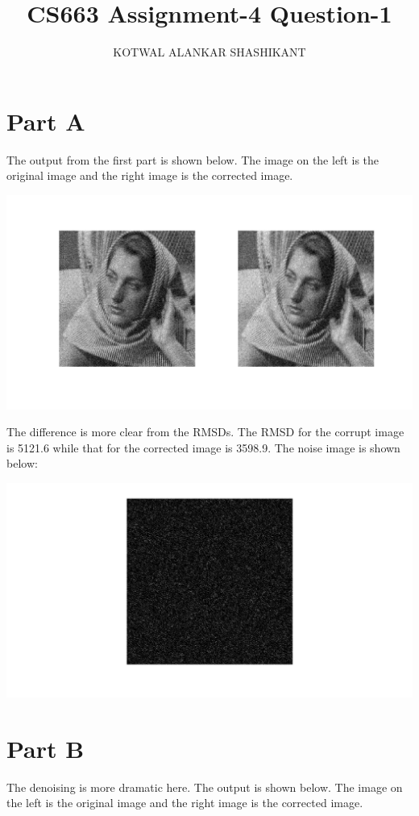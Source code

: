 \documentclass[10pt]{report}
\begin{document}
\title{CS663 Assignment-4 Question-1}
\author{KOTWAL ALANKAR SHASHIKANT}
\maketitle

\section*{Part A}
The output from the first part is shown below. The image on the left is the original image and the right image is the corrected image.

\includegraphics[scale=0.35]{out1}

The difference is more clear from the RMSDs. The RMSD for the corrupt image is 5121.6 while that for the corrected image is 3598.9. The noise image is shown below:

\includegraphics[scale=0.35]{noise1}

\newpage
\section*{Part B}
The denoising is more dramatic here. The output is shown below. The image on the left is the original image and the right image is the corrected image.
\end{document}
